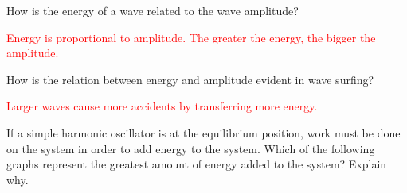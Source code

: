 \documentclass[]{exam}
\begin{document}
\begin{questions}

\question 
How is the energy of a wave related to the wave amplitude?

\ifprintanswers 
\textcolor{red}{Energy is proportional to amplitude. The greater the energy, the bigger the amplitude.}
\else \fillwithlines{14mm} \fi

\question
How is the relation between energy and amplitude evident in wave surfing?

\ifprintanswers 
\textcolor{red}{Larger waves cause more accidents by transferring more energy.}
\else \fillwithlines{14mm} \clearpage \fi


\question
If a simple harmonic oscillator is at the  equilibrium position, work must be done on the system in order to add energy to the system. Which of the following graphs represent the greatest amount of energy added to the system? Explain why. 


\end{questions}
\end{document}

